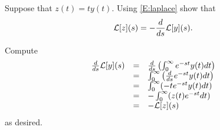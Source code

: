 \documentclass{ximera}
\begin{document}
\begin{exercise} \label{c13.1.2}
Suppose that $z(t)=ty(t)$.  Using \eqref{E:laplace} show that
\[
{\cal L}[z](s) = -\frac{\displaystyle d}{\displaystyle ds} {\cal L}[y](s).
\]

\begin{solution}
Compute
\[
\begin{array}{rcl}
\frac{d}{ds}{\cal L}[y](s)
& = & \frac{d}{ds}\left(\int_0^\infty e^{-st}y(t)dt\right) \\
& = & \int_0^\infty\left(\frac{d}{ds} e^{-st}y(t)dt\right) \\
& = & \int_0^\infty (-te^{-st}y(t)dt) \\
& = & -\int_0^\infty (z(t)e^{-st}dt) \\
& = & -{\cal L}[z](s)
\end{array}
\]
as desired.





\end{solution}
\end{exercise}
\end{document}
